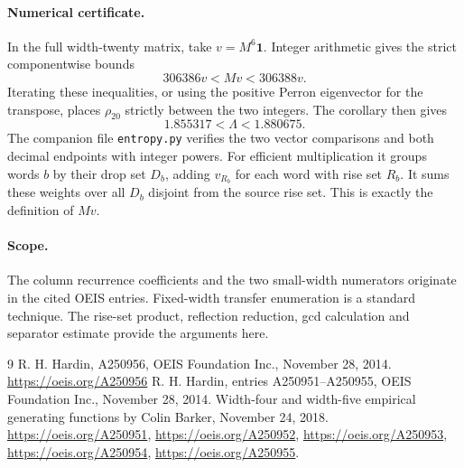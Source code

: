 \documentclass[11pt]{article}
\begin{document}
\paragraph{Numerical certificate.}
In the full width-twenty matrix, take $v=M^6\mathbf1$. Integer arithmetic gives the strict componentwise bounds
\[
             306386v<Mv<306388v .
\]
Iterating these inequalities, or using the positive Perron eigenvector for the transpose, places $\rho_{20}$ strictly between the two integers. The corollary then gives
\[
                       1.855317<\Lambda<1.880675 .
\]
The companion file \texttt{entropy.py} verifies the two vector comparisons and both decimal endpoints with integer powers. For efficient multiplication it groups words $b$ by their drop set $D_b$, adding $v_{R_b}$ for each word with rise set $R_b$. It sums these weights over all $D_b$ disjoint from the source rise set. This is exactly the definition of $Mv$.

\paragraph{Scope.}
The column recurrence coefficients and the two small-width numerators originate in the cited OEIS entries. Fixed-width transfer enumeration is a standard technique. The rise-set product, reflection reduction, gcd calculation and separator estimate provide the arguments here.

\begin{thebibliography}{9}
 R. H. Hardin, A250956, OEIS Foundation Inc., November 28, 2014. \url{https://oeis.org/A250956}
 R. H. Hardin, entries A250951--A250955, OEIS Foundation Inc., November 28, 2014. Width-four and width-five empirical generating functions by Colin Barker, November 24, 2018.
\url{https://oeis.org/A250951}, \url{https://oeis.org/A250952}, \url{https://oeis.org/A250953}, \url{https://oeis.org/A250954}, \url{https://oeis.org/A250955}.
\end{thebibliography}
\end{document}
